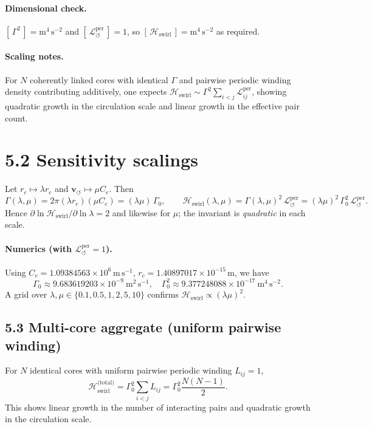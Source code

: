 \documentclass[11pt]{article}
\begin{document}
\paragraph{Dimensional check.}
    \([\,\Gamma^2\,]=\mathrm{m^4\,s^{-2}}\) and \([\,\mathcal{L}_{\circlearrowleft}^{\mathrm{per}}\,]=1\),
    so \([\,\mathcal{H}_{\text{swirl}}\,]=\mathrm{m^4\,s^{-2}}\) as required.

\paragraph{Scaling notes.}
    For $N$ coherently linked cores with identical $\Gamma$ and pairwise periodic winding density contributing additively, one expects
    $ \mathcal{H}_{\text{swirl}}\sim \Gamma^2 \sum_{i<j}\mathcal{L}_{ij}^{\mathrm{per}} $,
    showing quadratic growth in the circulation scale and linear growth in the effective pair count.

\section*{5.2 Sensitivity scalings}
Let $r_c \mapsto \lambda r_c$ and $\mathbf{v}_{\scriptscriptstyle\boldsymbol{\circlearrowleft}} \mapsto \mu C_e$. Then
\[
    \Gamma(\lambda,\mu) = 2\pi (\lambda r_c)(\mu C_e) = (\lambda\mu)\,\Gamma_0,\qquad
    \mathcal{H}_{\text{swirl}}(\lambda,\mu) = \Gamma(\lambda,\mu)^2\,\mathcal{L}_{\circlearrowleft}^{\mathrm{per}}
    = (\lambda\mu)^2\,\Gamma_0^2 \,\mathcal{L}_{\circlearrowleft}^{\mathrm{per}}.
\]
Hence $\partial\ln\mathcal{H}_{\text{swirl}}/\partial\ln\lambda = 2$ and likewise for $\mu$; the invariant is \emph{quadratic} in each scale.

\paragraph{Numerics (with $\mathcal{L}_{\circlearrowleft}^{\mathrm{per}}=1$).}
    Using $C_e=1.09384563\times10^6\,\mathrm{m\,s^{-1}}$, $r_c=1.40897017\times10^{-15}\,\mathrm{m}$, we have
    \[
        \Gamma_0 \approx 9.683619203\times10^{-9}\ \mathrm{m^2\,s^{-1}},
        \quad
        \Gamma_0^2 \approx 9.377248088\times10^{-17}\ \mathrm{m^4\,s^{-2}}.
    \]
    A grid over $\lambda,\mu\in\{0.1,0.5,1,2,5,10\}$ confirms $\mathcal{H}_{\text{swirl}} \propto (\lambda\mu)^2$.

\subsection*{5.3 Multi-core aggregate (uniform pairwise winding)}
For $N$ identical cores with uniform pairwise periodic winding $L_{ij}=1$,
\[
    \mathcal{H}_{\text{swirl}}^{\text{(total)}}
    = \Gamma_0^2 \sum_{i<j} L_{ij}
    = \Gamma_0^2 \frac{N(N-1)}{2}.
\]
This shows linear growth in the number of interacting pairs and quadratic growth in the circulation scale.
\end{document}
